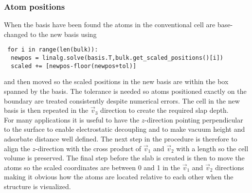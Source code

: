 \documentclass[11pt]{article} %
\begin{document}
\subsubsection{Atom positions}
When the basis have been found the atoms in the conventional cell are base-changed to the new basis using \begin{verbatim}
 for i in range(len(bulk)):
  newpos = linalg.solve(basis.T,bulk.get_scaled_positions()[i])
  scaled += [newpos-floor(newpos+tol)]
\end{verbatim} 
and then moved so the scaled positions in the new basis are within the box spanned by the basis. The tolerance is needed so atoms positioned exactly on the boundary are treated consistently despite numerical errors. The cell in the new basis is then repeated in the $\vec{v}_3$ direction to create the required slap depth. \\
For many applications it is useful to have the $z$-direction pointing perpendicular to the surface to enable electrostatic decoupling and to make vacuum height and adsorbate distance well defined. The next step in the procedure is therefore to align the $z$-direction with the cross product of $\vec{v}_1$ and $\vec{v}_2$ with a length so the cell volume is preserved. The final step before the slab is created is then to move the atoms so the scaled coordinates are between 0 and 1 in the $\vec{v}_1$ and $\vec{v}_2$ directions making it obvious how the atoms are located relative to each other when the structure is visualized.
\end{document}
